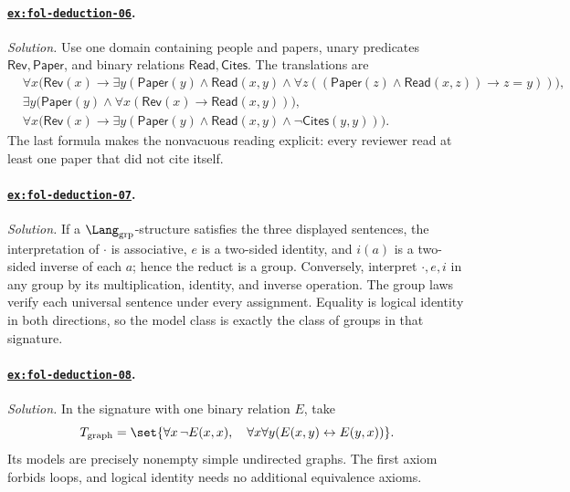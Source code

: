 \paragraph{\hyperref[ex:fol-deduction-06]{\texttt{ex:fol-deduction-06}}.}
\textit{Solution.}  Use one domain containing people and papers, unary
predicates \(\mathsf{Rev},\mathsf{Paper}\), and binary relations
\(\mathsf{Read},\mathsf{Cites}\).  The translations are
\[
\begin{aligned}
&\forall x\bigl(\mathsf{Rev}(x)\to\exists y(\mathsf{Paper}(y)\land
 \mathsf{Read}(x,y)\land
 \forall z((\mathsf{Paper}(z)\land\mathsf{Read}(x,z))\to z=y))\bigr),\\
&\exists y\bigl(\mathsf{Paper}(y)\land
 \forall x(\mathsf{Rev}(x)\to\mathsf{Read}(x,y))\bigr),\\
&\forall x\bigl(\mathsf{Rev}(x)\to\exists y(\mathsf{Paper}(y)\land
 \mathsf{Read}(x,y)\land\neg\mathsf{Cites}(y,y))\bigr).
\end{aligned}
\]
The last formula makes the nonvacuous reading explicit: every reviewer read at
least one paper that did not cite itself.

\paragraph{\hyperref[ex:fol-deduction-07]{\texttt{ex:fol-deduction-07}}.}
\textit{Solution.}  If a \(\Lang_{\mathrm{grp}}\)-structure satisfies the three
displayed sentences, the interpretation of \(\cdot\) is associative,
\(e\) is a two-sided identity, and \(i(a)\) is a two-sided inverse of each
\(a\); hence the reduct is a group.  Conversely, interpret \(\cdot,e,i\) in
any group by its multiplication, identity, and inverse operation.  The group
laws verify each universal sentence under every assignment.  Equality is
logical identity in both directions, so the model class is exactly the class of
groups in that signature.

\paragraph{\hyperref[ex:fol-deduction-08]{\texttt{ex:fol-deduction-08}}.}
\textit{Solution.}  In the signature with one binary relation \(E\), take
\[
T_{\mathrm{graph}}=\set{
\forall x\,\neg E(x,x),\quad
\forall x\forall y(E(x,y)\leftrightarrow E(y,x))}.
\]
Its models are precisely nonempty simple undirected graphs.  The first axiom
forbids loops, and logical identity needs no additional equivalence axioms.

